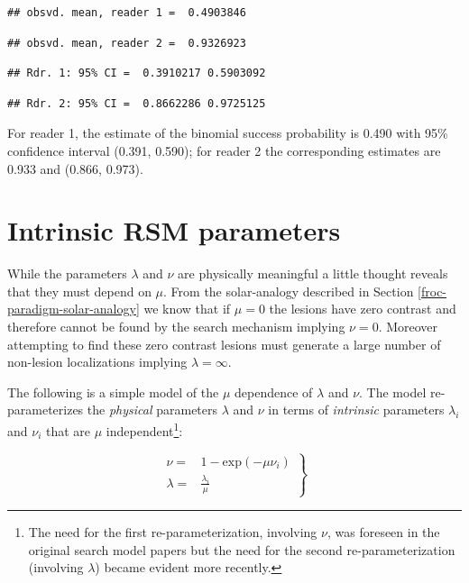 \documentclass[
]{book}
\begin{document}
\begin{verbatim}
## obsvd. mean, reader 1 =  0.4903846
\end{verbatim}

\begin{verbatim}
## obsvd. mean, reader 2 =  0.9326923
\end{verbatim}

\begin{verbatim}
## Rdr. 1: 95% CI =  0.3910217 0.5903092
\end{verbatim}

\begin{verbatim}
## Rdr. 2: 95% CI =  0.8662286 0.9725125
\end{verbatim}

For reader 1, the estimate of the binomial success probability is 0.490 with 95\% confidence interval (0.391, 0.590); for reader 2 the corresponding estimates are 0.933 and (0.866, 0.973).

\hypertarget{rsm-intrinsic-parameters}{%
\section{Intrinsic RSM parameters}\label{rsm-intrinsic-parameters}}

While the parameters \(\lambda\) and \(\nu\) are physically meaningful a little thought reveals that they must depend on \(\mu\). From the solar-analogy described in Section \ref{froc-paradigm-solar-analogy} we know that if \(\mu = 0\) the lesions have zero contrast and therefore cannot be found by the search mechanism implying \(\nu = 0\). Moreover attempting to find these zero contrast lesions must generate a large number of non-lesion localizations implying \(\lambda = \infty\).

The following is a simple model of the \(\mu\) dependence of \(\lambda\) and \(\nu\). The model re-parameterizes the \emph{physical} parameters \(\lambda\) and \(\nu\) in terms of \emph{intrinsic} parameters \(\lambda_i\) and \(\nu_i\) that are \(\mu\) independent\footnote{The need for the first re-parameterization, involving \(\nu\), was foreseen in the original search model papers \citep{chakraborty2006search, chakraborty2006roc} but the need for the second re-parameterization (involving \(\lambda\)) became evident more recently.}:

\begin{equation}
\left. 
\begin{aligned}
\nu =& 1 - \text{exp}\left ( - \mu \nu_i \right ) \\
\lambda =& \frac{\lambda_i}{\mu}
\end{aligned}
\right \}
\label{eq:rsm-transform}
\end{equation}
\end{document}
